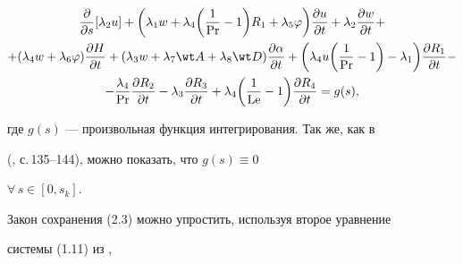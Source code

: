 \begin{multline} 


\frac{\partial}{\partial s}[\lambda_2u]+\bigg(\lambda_1w+ 


\lambda_4\bigg(\frac{1}{\PR}-1\bigg)R_1+\lambda_5\varphi\bigg) 


\frac{\partial u}{\partial t}+\lambda_2 


\frac{\partial w}{\partial t}+ \\ 


+(\lambda_4w+\lambda_6\varphi) 


\frac{\partial H}{\partial t}+(\lambda_3w+ 


\lambda_7\wt A+\lambda_8\wt D) 


\frac{\partial\alpha}{\partial t}+\bigg(\lambda_4u 


\bigg(\frac{1}{\PR}-1\bigg)-\lambda_1\bigg) 


\frac{\partial R_1}{\partial t}- \\ 


% 


-\frac{\lambda_4}{\PR}\frac{\partial R_2}{\partial t}- 


\lambda_3\frac{\partial R_3}{\partial t}+\lambda_4\bigg( 


\frac{1}{\Le}-1\bigg)\frac{\partial R_4}{\partial t}=g(s), 


\end{multline} 


где $g(s)$ --- произвольная функция интегрирования. Так же, как в 


(\cite{1}, с.\,135--144), можно показать, что $g(s)\equiv0$ 


$\forall\,s\in[0,s_k]$. 


 


Закон сохранения (2.3) можно упростить, используя второе уравнение


системы (1.11) из \cite{2}, 


